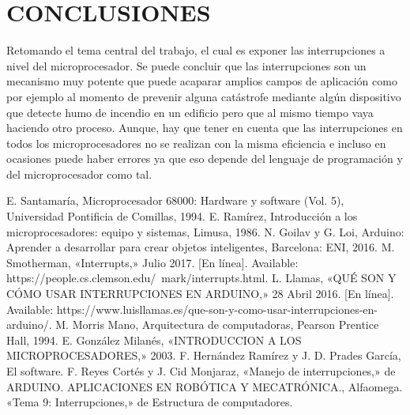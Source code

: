 \documentclass[11pt,letterpaper]{article}
\begin{document}
\section{CONCLUSIONES}
Retomando el tema central del trabajo, el cual es exponer las interrupciones a nivel del microprocesador. Se puede concluir que las interrupciones son un mecanismo muy potente que puede acaparar amplios campos de aplicación como por ejemplo al momento de prevenir alguna catástrofe mediante algún dispositivo que detecte humo de incendio en un edificio pero que al mismo tiempo vaya haciendo otro proceso. Aunque, hay que tener en cuenta que las interrupciones en todos los microprocesadores no se realizan con la misma eficiencia e incluso en ocasiones puede haber errores ya que eso depende del lenguaje de programación y del microprocesador como tal.
\newline


\begin{thebibliography}{99}
 E. Santamaría, Microprocesador 68000: Hardware y software (Vol. 5), Universidad Pontificia de Comillas, 1994.
 E. Ramírez, Introducción a los microprocesadores: equipo y sistemas, Limusa, 1986.
 N. Goilav y G. Loi, Arduino: Aprender a desarrollar para crear objetos inteligentes, Barcelona: ENI, 2016.
 M. Smotherman, «Interrupts,» Julio 2017. [En línea]. Available: https://people.cs.clemson.edu/~mark/interrupts.html.
 L. Llamas, «QUÉ SON Y CÓMO USAR INTERRUPCIONES EN ARDUINO,» 28 Abril 2016. [En línea]. Available: https://www.luisllamas.es/que-son-y-como-usar-interrupciones-en-arduino/.
 M. Morris Mano, Arquitectura de computadoras, Pearson Prentice Hall, 1994.
 E. González Milanés, «INTRODUCCION A LOS MICROPROCESADORES,» 2003.
 F. Hernández Ramírez y J. D. Prades García, El software. 
 F. Reyes Cortés y J. Cid Monjaraz, «Manejo de interrupciones,» de ARDUINO. APLICACIONES EN ROBÓTICA Y MECATRÓNICA., Alfaomega.
 «Tema 9: Interrupciones,» de Estructura de computadores.
\end{thebibliography}
\end{document}
